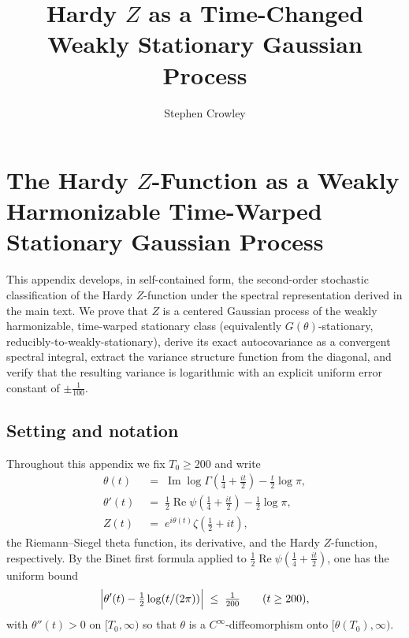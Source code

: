 \documentclass[11pt]{amsart}
\title{Hardy $Z$ as a Time-Changed Weakly Stationary Gaussian Process}
\author{Stephen Crowley}
\date{}
\theoremstyle{definition}
\DeclareMathOperator{\ImOp}{Im}
\DeclareMathOperator{\ReOp}{Re}
\let\Im\ImOp
\let\Re\ReOp
\begin{document}
\appendix

\section{The Hardy \texorpdfstring{$Z$}{Z}-Function as a Weakly Harmonizable Time-Warped Stationary Gaussian Process}
\label{app:warped}

This appendix develops, in self-contained form, the second-order stochastic
classification of the Hardy $Z$-function under the spectral representation
derived in the main text. We prove that $Z$ is a centered Gaussian process of
the weakly harmonizable, time-warped stationary class
(equivalently $G(\theta)$-stationary, reducibly-to-weakly-stationary), derive
its exact autocovariance as a convergent spectral integral, extract the
variance structure function from the diagonal, and verify that the resulting
variance is logarithmic with an explicit uniform error constant of
$\pm \tfrac{1}{100}$.

\subsection{Setting and notation}
\label{sub:setting}

Throughout this appendix we fix $T_{0}\ge 200$ and write
\begin{align}
\theta(t) &\;=\; \Im\log\Gamma\!\left(\tfrac{1}{4}+\tfrac{it}{2}\right)-\tfrac{t}{2}\log\pi, \label{eq:theta}\\
\theta'(t) &\;=\; \tfrac{1}{2}\Re\psi\!\left(\tfrac{1}{4}+\tfrac{it}{2}\right)-\tfrac{1}{2}\log\pi, \label{eq:thetap}\\
Z(t) &\;=\; e^{i\theta(t)}\zeta\!\left(\tfrac{1}{2}+it\right),\label{eq:Zdef}
\end{align}
the Riemann--Siegel theta function, its derivative, and the Hardy
$Z$-function, respectively. By the Binet first formula applied to
$\tfrac12\Re\psi(\tfrac14+\tfrac{it}{2})$, one has the uniform bound
\begin{equation}\label{eq:binet}
\Bigl|\theta'(t)-\tfrac{1}{2}\log(t/(2\pi))\Bigr|\;\le\;\tfrac{1}{200}
\qquad(t\ge 200),
\end{equation}
with $\theta''(t)>0$ on $[T_{0},\infty)$ so that $\theta$ is a
$C^{\infty}$-diffeomorphism onto $[\theta(T_{0}),\infty)$.
\end{document}
